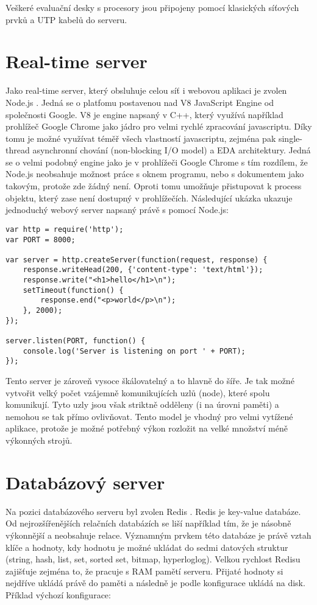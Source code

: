 Veškeré evaluační desky s procesory jsou připojeny pomocí klasických síťových prvků a UTP kabelů do serveru.

\section{Real-time server}
Jako real-time server, který obsluhuje celou síť i webovou aplikaci je zvolen Node.js \cite{nodejs}. Jedná se o platfomu postavenou nad V8 JavaScript Engine od společnosti Google. V8 je engine napsaný v C++, který využívá například prohlížeč Google Chrome jako jádro pro velmi rychlé zpracování javascriptu. Díky tomu je možné využívat téměř všech vlastností javascriptu, zejména pak single-thread asynchronní chování (non-blocking I/O model) a EDA architektury. Jedná se o velmi podobný engine jako je v prohlížeči Google Chrome s tím rozdílem, že Node.js neobsahuje možnost práce s oknem programu, nebo s dokumentem jako takovým, protože zde žádný není. Oproti tomu umožňuje přistupovat k process objektu, který zase není dostupný v prohlížečích. Následující ukázka ukazuje jednoduchý webový server napsaný právě s pomocí Node.js:

\begin{verbatim}
var http = require('http');
var PORT = 8000;

var server = http.createServer(function(request, response) {
	response.writeHead(200, {'content-type': 'text/html'});
	response.write("<h1>hello</h1>\n");
	setTimeout(function() {
		response.end("<p>world</p>\n");
	}, 2000);
});

server.listen(PORT, function() {
	console.log('Server is listening on port ' + PORT);
});
\end{verbatim}

Tento server je zároveň vysoce škálovatelný a to hlavně do šíře. Je tak možné vytvořit velký počet vzájemně komunikujících uzlů (node), které spolu komunikují. Tyto uzly jsou však striktně odděleny (i na úrovni paměti) a nemohou se tak přímo ovlivňovat. Tento model je vhodný pro velmi vytížené aplikace, protože je možné potřebný výkon rozložit na velké množství méně výkonných strojů.

\section{Databázový server}
Na pozici databázového serveru byl zvolen Redis \cite{redis}. Redis je key-value databáze. Od nejrozšířenějších relačních databázích se liší například tím, že je násobně výkonnější a neobsahuje relace. Významným prvkem této databáze je právě vztah klíče a hodnoty, kdy hodnotu je možné ukládat do sedmi datových struktur (string, hash, list, set, sorted set, bitmap, hyperloglog). Velkou rychlost Redisu zajišťuje zejména to, že pracuje s RAM pamětí serveru. Přijaté hodnoty si nejdříve ukládá právě do paměti a následně je podle konfigurace ukládá na disk. Příklad výchozí konfigurace:

